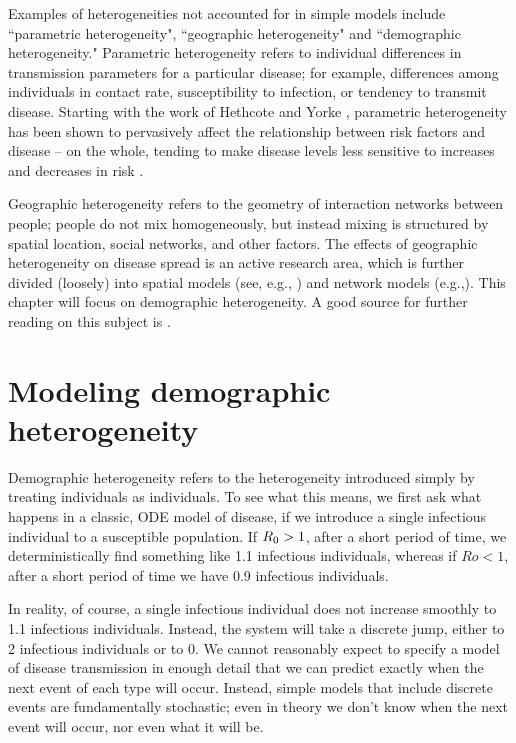 \documentclass{amsproc}
\theoremstyle{definition}
\theoremstyle{remark}
\numberwithin{equation}{section}
\begin{document}
Examples of heterogeneities not accounted for in simple models include ``parametric heterogeneity", ``geographic heterogeneity" and ``demographic heterogeneity."  Parametric heterogeneity refers to individual differences in transmission parameters for a particular disease; for example, differences among individuals in contact rate, susceptibility to infection, or tendency to transmit disease.  Starting with the work of Hethcote and Yorke , parametric heterogeneity has been shown to pervasively affect the relationship between risk factors and disease -- on the whole, tending to make disease levels less sensitive to increases and decreases in risk . 

Geographic heterogeneity refers to the geometry of interaction networks between people; people do not mix homogeneously, but instead mixing is structured by spatial location, social networks, and other factors.  The effects of geographic heterogeneity on disease spread is an active research area, which is further divided (loosely) into spatial models (see, e.g., ) and network models (e.g.,).  This chapter will focus on demographic heterogeneity.  A good source for further reading on this subject is .

\section{Modeling demographic heterogeneity}

Demographic heterogeneity refers to the heterogeneity introduced simply by treating individuals as individuals.
To see what this means, we first ask what happens in a classic, ODE model of disease, if we introduce a single infectious individual to a susceptible population.
If $R_0>1$, after a short period of time, we deterministically find something like 1.1 infectious individuals, whereas if $Ro<1$, after a short period of time we have 0.9 infectious individuals.

In reality, of course, a single infectious individual does not increase smoothly to 1.1 infectious individuals.  
Instead, the system will take a discrete jump, either to 2 infectious individuals or to 0.
We cannot reasonably expect to specify a model of disease transmission in enough detail that we can predict exactly when the next event of each type will occur.
Instead, simple models that include discrete events are fundamentally stochastic; even in theory we don't know when the next event will occur, nor even what it will be.
\end{document}
